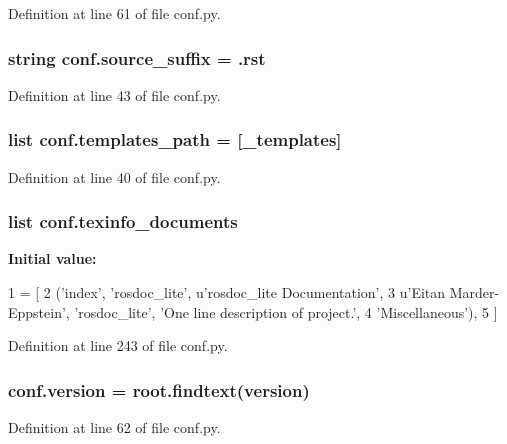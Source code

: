 Definition at line 61 of file conf.\+py.

\subsubsection[{\texorpdfstring{source\+\_\+suffix}{source_suffix}}]{\setlength{\rightskip}{0pt plus 5cm}string conf.\+source\+\_\+suffix = \textquotesingle{}.rst\textquotesingle{}}\hypertarget{namespaceconf_a10af2a769eb3bd3322e874f677e435b1}{}\label{namespaceconf_a10af2a769eb3bd3322e874f677e435b1}


Definition at line 43 of file conf.\+py.

\subsubsection[{\texorpdfstring{templates\+\_\+path}{templates_path}}]{\setlength{\rightskip}{0pt plus 5cm}list conf.\+templates\+\_\+path = \mbox{[}\textquotesingle{}\+\_\+templates\textquotesingle{}\mbox{]}}\hypertarget{namespaceconf_ae850ae634911b713e036b43894fdd525}{}\label{namespaceconf_ae850ae634911b713e036b43894fdd525}


Definition at line 40 of file conf.\+py.

\subsubsection[{\texorpdfstring{texinfo\+\_\+documents}{texinfo_documents}}]{\setlength{\rightskip}{0pt plus 5cm}list conf.\+texinfo\+\_\+documents}\hypertarget{namespaceconf_a54b0faed214ac92017d5689efbb10672}{}\label{namespaceconf_a54b0faed214ac92017d5689efbb10672}
{\bfseries Initial value\+:}
\begin{DoxyCode}
1 = [
2   (\textcolor{stringliteral}{'index'}, \textcolor{stringliteral}{'rosdoc\_lite'}, \textcolor{stringliteral}{u'rosdoc\_lite Documentation'},
3    \textcolor{stringliteral}{u'Eitan Marder-Eppstein'}, \textcolor{stringliteral}{'rosdoc\_lite'}, \textcolor{stringliteral}{'One line description of project.'},
4    \textcolor{stringliteral}{'Miscellaneous'}),
5 ]
\end{DoxyCode}


Definition at line 243 of file conf.\+py.

\subsubsection[{\texorpdfstring{version}{version}}]{\setlength{\rightskip}{0pt plus 5cm}conf.\+version = root.\+findtext(\textquotesingle{}version\textquotesingle{})}\hypertarget{namespaceconf_af51f21968ea73bb4391b0d4aed1f7ad2}{}\label{namespaceconf_af51f21968ea73bb4391b0d4aed1f7ad2}


Definition at line 62 of file conf.\+py.


